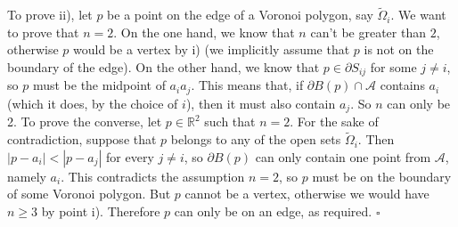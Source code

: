 \documentclass[a4paper]{article}
\newcommand{\abs}[1]{\left\lvert #1 \right\rvert}
\newcommand{\R}{\mathbb{R}}
\begin{document}
\begin{description}
	To prove ii), let $p$ be a point on the edge of a Voronoi polygon,
	say $\tilde{\Omega}_i$. We want to prove that $n=2$.
	On the one hand, we know that $n$ can't be greater than $2$, otherwise $p$
	would be a vertex by i) (we implicitly assume that $p$
	is not on the boundary of the edge).
	On the other hand, we know that $p \in \partial S_{ij}$ for some $j \neq i$,
	so $p$ must be the midpoint of $a_i a_j$.
	This means that, if $\partial B(p) \cap \mathcal{A}$ contains $a_i$
	(which it does, by the choice of $i$), then it must also	contain $a_j$.
	So $n$ can only be 2. To prove the converse, let $p \in \R^2$ such that $n = 2$.
	For the sake of contradiction, suppose that $p$ belongs to any of
	the open sets $\tilde{\Omega}_i$. Then $\abs{p-a_i} < \abs{p-a_j}$
	for every $j \neq i$, so $\partial B(p)$ can only contain
	one point from $\mathcal{A}$, namely $a_i$.
	This contradicts the assumption $n = 2$, so
	$p$ must be on the boundary of some Voronoi polygon.
	But $p$ cannot be a vertex, otherwise we would have $n \geq 3$
	by point i). Therefore $p$ can only be on an edge, as required. $\square$
\end{description}
\end{document}

